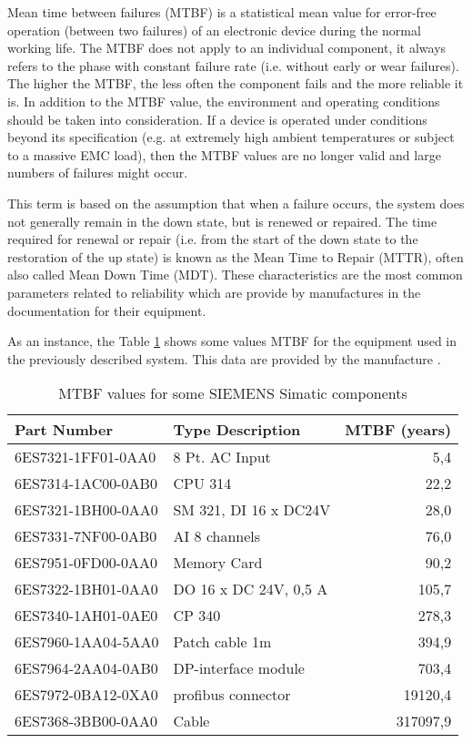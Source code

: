 Mean time between failures (MTBF) is a statistical mean value for error-free
operation (between two failures) of an electronic device during the normal working life. The MTBF does not apply
to an individual component, it always refers to the phase with constant failure
rate (i.e. without early or wear failures). The higher the MTBF, the less often
the component fails and the more reliable it is. In addition to the MTBF value, the
environment and operating conditions should be taken into consideration. If a
device is operated under conditions beyond its specification (e.g. at extremely
high ambient temperatures or subject to a massive EMC load), then the MTBF
values are no longer valid and large numbers of failures might occur.

This term is based on the assumption that when a failure occurs, the system does
not generally remain in the down state, but is renewed or repaired. The time
required for renewal or repair (i.e. from the start of the down state to the
restoration of the up state) is known as  the Mean Time to Repair (MTTR), often
also called  Mean Down Time (MDT). These characteristics are the most common
parameters related to reliability which are provide by manufactures in the
documentation for their equipment.

As an instance, the Table \ref{tbl:siemens_mtbf} shows some values MTBF for the
equipment used in the previously described system. This data are provided by the
manufacture \cite{siemens_mtbf}.

\begin{table}[t]
\caption{MTBF values for some SIEMENS Simatic components}
\centering
	\begin{tabular}{l l r}
	\\	
	Part Number & Type Description & MTBF (years) \\
	\hline 
	6ES7321-1FF01-0AA0	& 8 Pt. AC Input	& 5,4 \\
	6ES7314-1AC00-0AB0	& CPU 314	& 22,2 \\
	6ES7321-1BH00-0AA0	& SM 321, DI 16 x DC24V	& 28,0 \\
	6ES7331-7NF00-0AB0	& AI 8 channels	& 76,0 \\
	6ES7951-0FD00-0AA0	& Memory Card	& 90,2 \\
	6ES7322-1BH01-0AA0	& DO 16 x DC 24V, 0,5 A	& 105,7 \\
	6ES7340-1AH01-0AE0	& CP 340	& 278,3 \\
	6ES7960-1AA04-5AA0	& Patch cable 1m	& 394,9 \\
	6ES7964-2AA04-0AB0	& DP-interface module	& 703,4 \\
	6ES7972-0BA12-0XA0	& profibus connector	& 19120,4 \\
	6ES7368-3BB00-0AA0	& Cable	& 317097,9 \\
	\hline
	\end{tabular}
	\label{tbl:siemens_mtbf}
\end{table}


